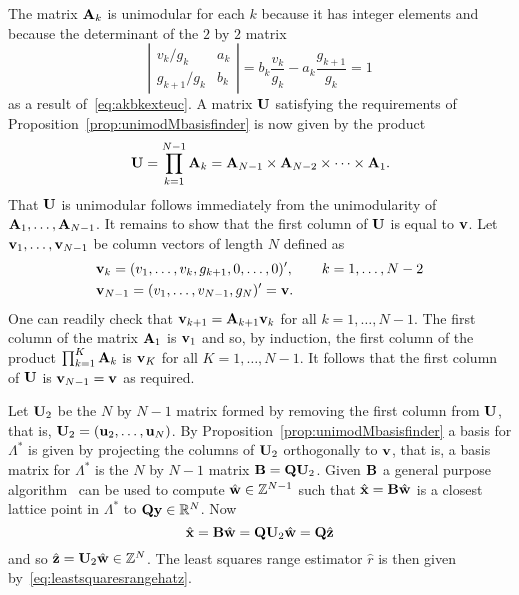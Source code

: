 \documentclass[10pt,twocolumn,twoside]{IEEEtran}
\begin{document}
The matrix $\mathbf{A}_k$ is unimodular for each $k$ because it has integer elements and because the determinant of the $2$ by $2$ matrix
\[
\left\vert\begin{array}{cc}
v_k/g_k & a_{k} \\
g_{k+1}/g_k & b_{k}  
\end{array}
\right\vert = b_k \frac{v_k}{g_k} - a_k \frac{g_{k+1}}{g_k} = 1
\]
as a result of~\eqref{eq:akbkexteuc}. A matrix $\mathbf{U}$ satisfying the requirements of Proposition~\ref{prop:unimodMbasisfinder} is now given by the product
\[
\mathbf{U} = \prod_{k=1}^{N-1} \mathbf{A}_k = \mathbf{A}_{N-1}\times \mathbf{A}_{N-2} \times \dots \times \mathbf{A}_1.
\]
That $\mathbf{U}$ is unimodular follows immediately from the unimodularity of $\mathbf{A}_1,\dots,\mathbf{A}_{N-1}$.  It remains to show that the first column of $\mathbf{U}$ is equal to $\mathbf{v}$.  Let $\mathbf{v}_1,\dots,\mathbf{v}_{N-1}$ be column vectors of length $N$ defined as
\begin{align*}
&\mathbf{v}_k = (v_1,\dots,v_k, g_{k+1},0,\dots,0)^\prime, \qquad k = 1,\dots,N-2 \\
&\mathbf{v}_{N-1} = (v_1,\dots,v_{N-1}, g_{N})^\prime = \mathbf{v}.
\end{align*}
One can readily check that $\mathbf{v}_{k+1} = \mathbf{A}_{k+1}\mathbf{v}_k$ for all $k=1,\dots,N-1$.  The first column of the matrix $\mathbf{A}_1$ is $\mathbf{v}_1$ and so, by induction, the first column of the product $\prod_{k=1}^K \mathbf{A}_k$ is $\mathbf{v}_K$ for all $K = 1,\dots,N-1$. It follows that the first column of $\mathbf{U}$ is $\mathbf{v}_{N-1} = \mathbf{v}$ as required.  %

Let $\mathbf{U}_2$ be the $N$ by $N-1$ matrix formed by removing the first column from $\mathbf{U}$, that is, $\mathbf{U}_2 =(\mathbf{u}_2,\dots,\mathbf{u}_N)$.  By Proposition~\ref{prop:unimodMbasisfinder} a basis for $\Lambda^*$ is given by projecting the columns of $\mathbf{U}_2$ orthogonally to $\mathbf{v}$, that is, a basis matrix for $\Lambda^*$ is the $N$ by $N-1$ matrix $\mathbf{B} = \mathbf{Q}\mathbf{U}_2$.  Given $\mathbf{B}$ a general purpose algorithm~\cite{Agrell2002} can be used to compute $\hat{\mathbf{w}} \in {\mathbb Z}^{N-1}$ such that $\hat{\mathbf{x}} = \mathbf{B}\hat{\mathbf{w}}$ is a closest lattice point in $\Lambda^*$ to $\mathbf{Q}\mathbf{y} \in {\mathbb R}^{N}$.  Now
\[
\hat{\mathbf{x}} = \mathbf{B}\hat{\mathbf{w}} = \mathbf{Q}\mathbf{U}_2\hat{\mathbf{w}} = \mathbf{Q}\hat{\mathbf{z}}
\]
and so $\hat{\mathbf{z}} = \mathbf{U}_2\hat{\mathbf{w}} \in {\mathbb Z}^N$.  The least squares range estimator $\hat{r}$ is then given by~\eqref{eq:leastsquaresrangehatz}. 

\end{document}
